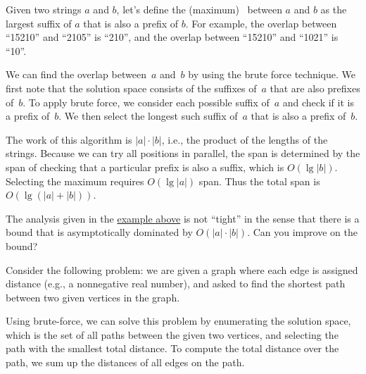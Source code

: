 \begin{example}
\label{ex:design::bf::overlaps}
  Given two strings $a$ and $b$, let's define the
  (maximum)~ between $a$ and $b$ as the largest suffix
  of $a$ that is also a prefix of $b$. For example, the overlap
  between ``15210'' and ``2105'' is ``210'', and the overlap between
  ``15210'' and ``1021'' is ``10''.
%

We can find the overlap between~$a$ and~$b$ by using the brute force
technique.
%
We first note that the solution space consists of the suffixes of~$a$
that are also prefixes of~$b$.
%
To apply brute force, we consider each possible suffix of~$a$ and
check if it is a prefix of~$b$.
%
We then select the longest such suffix of~$a$ that is also a prefix
of~$b$.
%

The work of this algorithm is $|a| \cdot |b|$, i.e., the product of
the lengths of the strings. 
%
Because we can try all positions in
parallel, the span is determined by the span of checking that a particular prefix is also a suffix, which is $O(\lg{|b|})$.  
%
Selecting the maximum requires  $O(\lg{|a|})$ span.
%
Thus the total span is $O(\lg{(|a| + |b|)})$.

\end{example}


\begin{exercise}
The analysis given in the \href{ex:design::bf::overlaps}{example above} is not ``tight'' in the sense that there is a bound that is asymptotically dominated by
$O(|a| \cdot |b|)$.  
%
Can you improve on the bound? 
\end{exercise}


\begin{example}
\label{ex:design::bf::shortest-paths}
Consider the following problem: we are given a graph where each edge
is assigned distance (e.g., a nonnegative real number), and asked to find
the shortest path between two given vertices in the graph.

Using brute-force, we can solve this problem by enumerating the
solution space, which is the set of all paths between the given two
vertices, and selecting the path with the smallest total distance.
%
To compute the total distance over the path, we sum up the distances
of all edges on the path.
\end{example}


